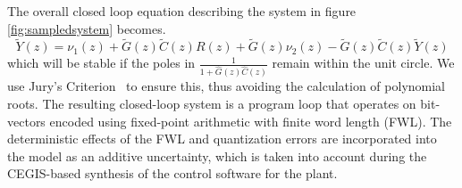 \documentclass[final]{sig-alternate-05-2015}
\begin{document}
The overall closed loop equation describing the system in figure \ref{fig:sampledsystem} becomes.
\begin{equation}
\tilde{Y}(z)=\nu_{1}(z)+\tilde{G}(z) \tilde{C}(z) R(z)+\tilde{G}(z)\nu_{2}(z)-\tilde{G}(z) \tilde{C}(z) \tilde{Y}(z)
\end{equation}
which will be stable if the poles in $\frac{1}{1+\hat{G}(z)\hat{C}(z)}$ remain within the unit circle.
We use Jury's Criterion~\cite{astrom1997computer} to ensure this, thus avoiding the calculation of polynomial roots.
The resulting closed-loop
system is a program loop that operates on bit-vectors encoded using
fixed-point arithmetic with finite word length (FWL).  The deterministic
effects of the FWL and quantization errors are incorporated into the model
as an additive uncertainty, which is taken into account during the
CEGIS-based synthesis of the control software for the plant.

\printccsdesc
\end{document}
